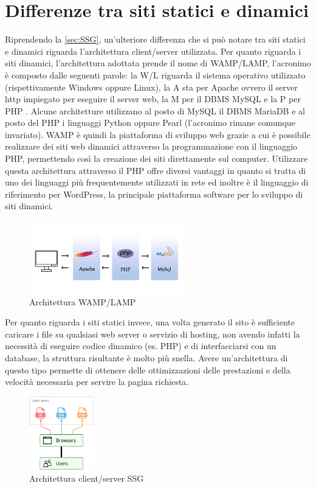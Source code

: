 \documentclass[target=bach,aauheader=]{thud}
\begin{document}
\section{Differenze tra siti statici e dinamici}
Riprendendo la \cref{sec:SSG}, un'ulteriore differenza che si può notare tra siti statici e dinamici riguarda l'architettura client/server utilizzata. \newline
Per quanto riguarda i siti dinamici, l'architettura adottata prende il nome di WAMP/LAMP, l'acronimo è composto dalle seguenti parole: la W/L riguarda il sistema operativo utilizzato (rispettivamente Windows oppure Linux),
la A sta per Apache ovvero il server http impiegato per eseguire il server web, la M per il DBMS MySQL e la P per PHP \cite{andrzej2007development}. Alcune architetture utilizzano al posto di MySQL il DBMS MariaDB e al posto del PHP i linguaggi Python oppure Pearl (l'acronimo rimane comunque invariato). \newline
WAMP è quindi la piattaforma di sviluppo web grazie a cui è possibile realizzare dei siti web dinamici attraverso la programmazione con il linguaggio PHP, permettendo così la creazione dei siti direttamente sul computer. 
Utilizzare questa architettura attraverso il PHP offre diversi vantaggi in quanto si tratta di uno dei linguaggi più frequentemente utilizzati in rete ed inoltre è il linguaggio di riferimento per WordPress, la principale piattaforma software per lo sviluppo di siti dinamici. 
\begin{figure}
    \centering
    \includegraphics[width = 0.6\textwidth]{images/WAMP_LAMP.png}
    \caption{Architettura WAMP/LAMP}
\end{figure}
\newline
Per quanto riguarda i siti statici invece, una volta generato il sito è sufficiente caricare i file su qualsiasi web server o servizio di hosting, non avendo infatti la necessità di eseguire codice dinamico (es. PHP) e di interfacciarsi con un database, la struttura risultante è molto più snella. 
Avere un'architettura di questo tipo permette di ottenere delle ottimizzazioni delle prestazioni e della velocità necessaria per servire la pagina richiesta. 
\begin{figure}[h]
    \centering
    \includegraphics[width = 0.25\textwidth]{images/static.png}
    \caption{Architettura client/server SSG}
    \label{img:architettura}
\end{figure}
\end{document}
